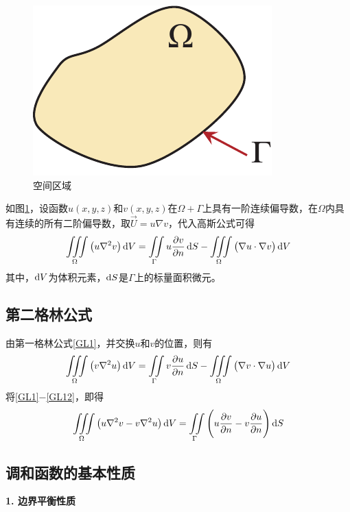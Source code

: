 \begin{figure}[!htb]
	\centering
	\includegraphics[width=0.2\linewidth]{pic/格林无点.pdf}
	\vspace*{-0.5em}
	\caption{空间区域}
	\label{格林2}
\end{figure}

\theorem[第一格林公式]
如图\ref{格林2}，设函数$u(x,y,z)$和$v(x,y,z)$在$\Omega + \Gamma$上具有一阶连续偏导数，在$\Omega$内具有连续的所有二阶偏导数，取$\vec{U} = u \nabla v$，代入高斯公式可得
\begin{equation}
	\iiint\limits_{\Omega}\big(u \nabla^2 v\big)\, {\rm{d}} V = \iint\limits_{\Gamma} u \dfrac{\partial v}{\partial n}\, {\rm{d}} S - \iiint\limits_{\Omega} \big(\nabla u \cdot \nabla v\big)\, {\rm{d}} V
	\label{GL1}
\end{equation}
其中，${\rm{d}} V$为体积元素，${\rm{d}} S$是$\Gamma$上的标量面积微元。
\vspace*{0.5em}

\subsection{第二格林公式}
\vspace*{-0.5em}
由第一格林公式\eqref{GL1}，并交换$u$和$v$的位置，则有
\begin{equation}
	\iiint\limits_{\Omega}\big(v \nabla^2 u\big)\, {\rm{d}} V = \iint\limits_{\Gamma} v \dfrac{\partial u}{\partial n}\, {\rm{d}} S - \iiint\limits_{\Omega} \big(\nabla v \cdot \nabla u\big)\, {\rm{d}} V
	\label{GL12}
\end{equation}
将\eqref{GL1}$-$\eqref{GL12}，即得
\begin{equation}
	\iiint\limits_{\Omega} \big(u \nabla^2 v - v \nabla^2 u\big)\, {\rm{d}} V = \iint\limits_{\Gamma} \Bigg(u\dfrac{\partial v}{\partial n} - v \dfrac{\partial u}{\partial n}\Bigg)\, {\rm{d}} S
\end{equation}
\vspace*{0.5em}

\subsection{调和函数的基本性质}
\vspace*{-0.5em}
\noindent \textbf{1. 边界平衡性质}

